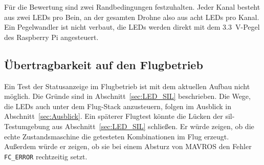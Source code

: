         Für die Bewertung sind zwei Randbedingungen festzuhalten. Jeder Kanal besteht aus zwei LEDs pro Bein, an der gesamten Drohne also aus acht LEDs pro Kanal. Ein Pegelwandler ist nicht verbaut, die LEDs werden direkt mit dem \SI{3,3}{\volt}-Pegel des Raspberry Pi angesteuert. %

        \subsection{Übertragbarkeit auf den Flugbetrieb}
        \label{sec:Eval_LED_Flug}

        Ein Test der Statusanzeige im Flugbetrieb ist mit dem aktuellen Aufbau nicht möglich. Die Gründe sind in Abschnitt~\ref{sec:LED_SIL} beschrieben. Die Wege, die LEDs auch unter dem Flug-Stack anzusteuern, folgen im Ausblick in Abschnitt~\ref{sec:Ausblick}. Ein späterer Flugtest könnte die Lücken der \gls{sil}-Testumgebung aus Abschnitt~\ref{sec:LED_SIL} schließen. Er würde zeigen, ob die echte Zustandsmaschine die getesteten Kombinationen im Flug erzeugt. Außerdem würde er zeigen, ob sie bei einem Absturz von MAVROS den Fehler \texttt{FC\_ERROR} rechtzeitig setzt.
